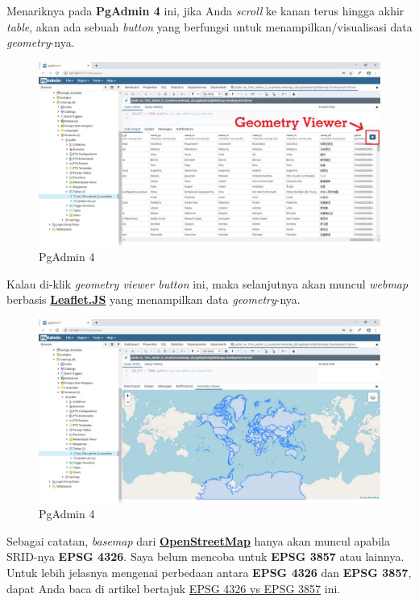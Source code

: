 \documentclass[]{book}
\begin{document}
Menariknya pada \textbf{PgAdmin 4} ini, jika Anda \emph{scroll} ke kanan terus hingga akhir \emph{table}, akan ada sebuah \emph{button} yang berfungsi untuk menampilkan/visualisasi data \emph{geometry}-nya.

\begin{figure}
\centering
\includegraphics{./img/pgadmin4-geometry-viewer-button.jpg}
\caption{PgAdmin 4}
\end{figure}

Kalau di-klik \emph{geometry viewer button} ini, maka selanjutnya akan muncul \emph{webmap} berbasis \href{https://leafletjs.com/}{\textbf{Leaflet.JS}} yang menampilkan data \emph{geometry}-nya.

\begin{figure}
\centering
\includegraphics{./img/pgadmin4-geometry-viewer-map.jpg}
\caption{PgAdmin 4}
\end{figure}

Sebagai catatan, \emph{basemap} dari \href{}{\textbf{OpenStreetMap}} hanya akan muncul apabila SRID-nya \textbf{EPSG 4326}. Saya belum mencoba untuk \textbf{EPSG 3857} atau lainnya. Untuk lebih jelasnya mengenai perbedaan antara \textbf{EPSG 4326} dan \textbf{EPSG 3857}, dapat Anda baca di artikel bertajuk \href{https://lyzidiamond.com/posts/4326-vs-3857}{EPSG 4326 vs EPSG 3857} ini.
\end{document}
